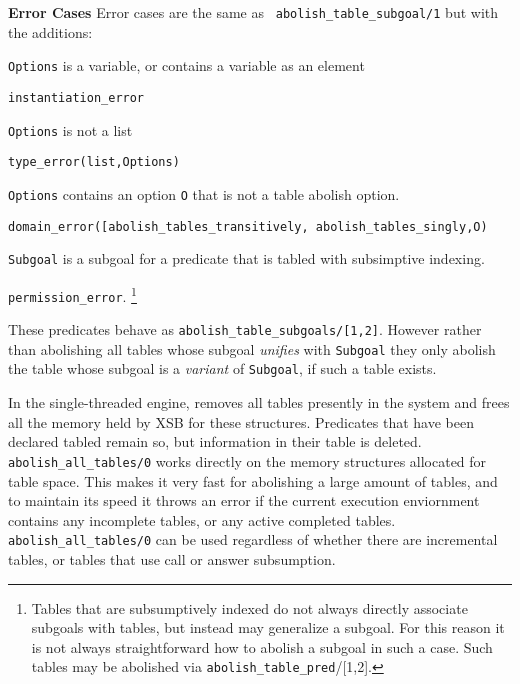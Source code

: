 \begin{description}
\begin{description}
{\bf Error Cases} Error cases are the same as {\tt
  abolish\_table\_subgoal/1} but with the additions: 
\bi
\item {\tt Options} is a variable, or contains a variable as an element
\bi
\item {\tt instantiation\_error}
\ei
\item {\tt Options} is not a list
\bi
\item {\tt type\_error(list,Options)}
\ei
\item {\tt Options} contains an option {\tt O} that is not a
  table abolish option.
\bi
\item {\tt domain\_error([abolish\_tables\_transitively, abolish\_tables\_singly,O)}
\ei
\item {\tt Subgoal} is a subgoal for a predicate that is tabled with
  subsimptive indexing.
  \bi
\item {\tt permission\_error}. \footnote{Tables that are subsumptively
  indexed do not always directly associate subgoals with tables, but
  instead may generalize a subgoal.  For this reason it is not always
  straightforward how to abolish a subgoal in such a case. Such tables
  may be abolished via {\tt abolish\_table\_pred}/[1,2].}
  \ei \ei


%
These predicates behave as {\tt abolish\_table\_subgoals/[1,2]}.
However rather than abolishing all tables whose subgoal {\em unifies}
with {\tt Subgoal} they only abolish the table whose subgoal is a {\em
  variant} of {\tt Subgoal}, if such a table exists.


%
In the single-threaded engine, removes all tables presently in the
system and frees all the memory held by XSB for these structures.
Predicates that have been declared tabled remain so, but information
in their table is deleted.  {\tt abolish\_all\_tables/0} works
directly on the memory structures allocated for table space.  This
makes it very fast for abolishing a large amount of tables, and to
maintain its speed it throws an error if the current execution
enviornment contains any incomplete tables, or any active completed
tables.  {\tt abolish\_all\_tables/0} can be used regardless of
whether there are incremental tables, or tables that use call or
answer subsumption.


\end{description}
\end{description}
